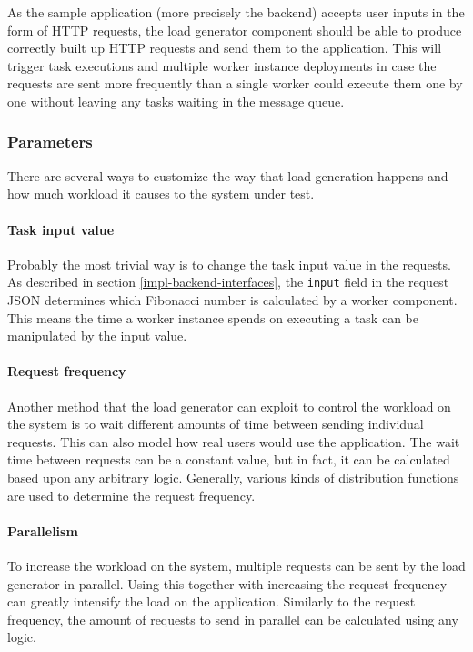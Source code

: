 As the sample application (more precisely the backend) accepts user inputs in the form of HTTP requests, the load generator component should be able to produce correctly built up HTTP requests and send them to the application. This will trigger task executions and multiple worker instance deployments in case the requests are sent more frequently than a single worker could execute them one by one without leaving any tasks waiting in the message queue.

\subsubsection{Parameters}


There are several ways to customize the way that load generation happens and how much workload it causes to the system under test.

\paragraph{Task input value} Probably the most trivial way is to change the task input value in the requests. As described in section \ref{impl-backend-interfaces}, the \texttt{input} field in the request JSON determines which Fibonacci number is calculated by a worker component. This means the time a worker instance spends on executing a task can be manipulated by the input value.

\paragraph{Request frequency} Another method that the load generator can exploit to control the workload on the system is to wait different amounts of time between sending individual requests. This can also model how real users would use the application. The wait time between requests can be a constant value, but in fact, it can be calculated based upon any arbitrary logic. Generally, various kinds of distribution functions are used to determine the request frequency.

\paragraph{Parallelism} To increase the workload on the system, multiple requests can be sent by the load generator in parallel. Using this together with increasing the request frequency can greatly intensify the load on the application. Similarly to the request frequency, the amount of requests to send in parallel can be calculated using any logic.


